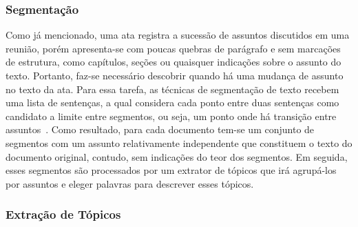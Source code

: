 














\subsubsection{Segmentação}

Como já mencionado, uma ata registra a sucessão de assuntos discutidos em uma reunião, porém apresenta-se com poucas quebras de parágrafo e sem marcações de estrutura, como capítulos, seções ou quaisquer indicações sobre o assunto do texto. Portanto, faz-se necessário descobrir quando há uma mudança de assunto no texto da ata. Para essa tarefa, as técnicas de segmentação de texto recebem uma lista de sentenças, a qual considera cada ponto entre duas sentenças como candidato a limite entre segmentos, ou seja, um ponto onde há transição entre assuntos~\cite{Bokaei2016}. Como resultado, para cada documento tem-se um conjunto de segmentos com um assunto relativamente independente que constituem o texto do documento original, contudo, sem indicações do teor dos segmentos. Em seguida, esses segmentos são processados por um extrator de tópicos que irá agrupá-los por assuntos e eleger palavras para descrever esses tópicos.






\subsubsection{Extração de Tópicos}

